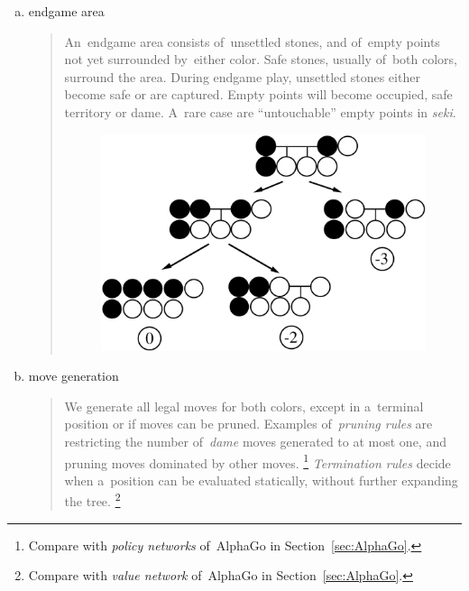 \begin{enumerate}[(a)]
  \item endgame area
    \begin{quotation}
      An~endgame area consists of~unsettled stones, and of~empty points not yet surrounded by~either color.
      Safe stones, usually of~both colors, surround the area.
      During endgame play, unsettled stones either become safe or are captured.
      Empty points will become occupied, safe territory or dame.
      A~rare case are ``untouchable'' empty points in \emph{seki}.

      \begin{figure}[H]
        \centering
        \includegraphics[width=.7\textwidth]{../img/Go_search_tree.png}
      \end{figure}
    \end{quotation}

  \item move generation
    \begin{quotation}
      We generate all legal moves for both colors, except in a~terminal position or if moves can be pruned.
      Examples of~\emph{pruning rules} are restricting the number of~\emph{dame} moves generated to at most one, and pruning moves dominated by other moves.%
      \footnote{Compare with \emph{policy networks} of~AlphaGo in Section~\ref{sec:AlphaGo}.}
      \emph{Termination rules} decide when a~position can be evaluated statically, without further expanding the tree.%
      \footnote{Compare with \emph{value network} of~AlphaGo in Section~\ref{sec:AlphaGo}.}
    \end{quotation}


\end{enumerate}
